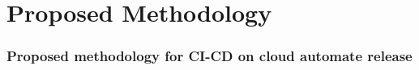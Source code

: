 \setcounter{section}{0}
\part{Proposed Methodology}\label{sec:proposedMethodology}

\section{Proposed methodology for CI-CD on cloud automate release}


\newpage